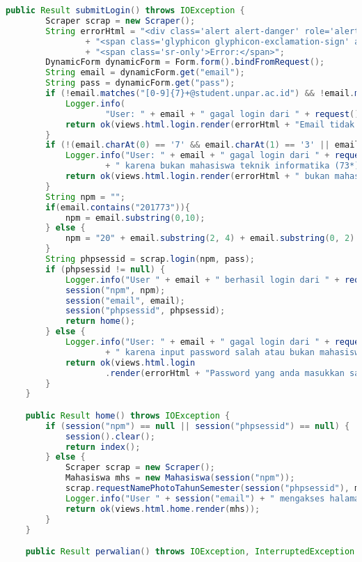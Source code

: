 \begin{lstlisting}[language=Java,basicstyle=\tiny,caption=Applicstion.java]
	public Result submitLogin() throws IOException {
		Scraper scrap = new Scraper();
		String errorHtml = "<div class='alert alert-danger' role='alert'>"
				+ "<span class='glyphicon glyphicon-exclamation-sign' aria-hidden='true'></span>"
				+ "<span class='sr-only'>Error:</span>";
		DynamicForm dynamicForm = Form.form().bindFromRequest();
		String email = dynamicForm.get("email");
		String pass = dynamicForm.get("pass");
		if (!email.matches("[0-9]{7}+@student.unpar.ac.id") && !email.matches("[0-9]{10}+@student.unpar.ac.id")) {
			Logger.info(
					"User: " + email + " gagal login dari " + request().remoteAddress() + " karena e-mail tidak valid");
			return ok(views.html.login.render(errorHtml + "Email tidak valid" + "</div>"));
		}
		if (!(email.charAt(0) == '7' && email.charAt(1) == '3' || email.contains("201773"))) {
			Logger.info("User: " + email + " gagal login dari " + request().remoteAddress()
					+ " karena bukan mahasiswa teknik informatika (73*)");
			return ok(views.html.login.render(errorHtml + " bukan mahasiswa teknik informatika" + "</div>"));
		}
		String npm = "";
		if(email.contains("201773")){
		    npm = email.substring(0,10);
        } else {
            npm = "20" + email.substring(2, 4) + email.substring(0, 2) + "0" + email.substring(4, 7);
        }
		String phpsessid = scrap.login(npm, pass);
		if (phpsessid != null) {
			Logger.info("User " + email + " berhasil login dari " + request().remoteAddress());
			session("npm", npm);
			session("email", email);
			session("phpsessid", phpsessid);
			return home();
		} else {
			Logger.info("User: " + email + " gagal login dari " + request().remoteAddress()
					+ " karena input password salah atau bukan mahasiswa aktif");
			return ok(views.html.login
					.render(errorHtml + "Password yang anda masukkan salah atau bukan mahasiswa aktif" + "</div>"));
		}
	}

	public Result home() throws IOException {
		if (session("npm") == null || session("phpsessid") == null) {
			session().clear();
			return index();
		} else {
			Scraper scrap = new Scraper();
			Mahasiswa mhs = new Mahasiswa(session("npm"));
			scrap.requestNamePhotoTahunSemester(session("phpsessid"), mhs);
			Logger.info("User " + session("email") + " mengakses halaman home dari " + request().remoteAddress());
			return ok(views.html.home.render(mhs));
		}
	}

	public Result perwalian() throws IOException, InterruptedException {


\end{lstlisting}
